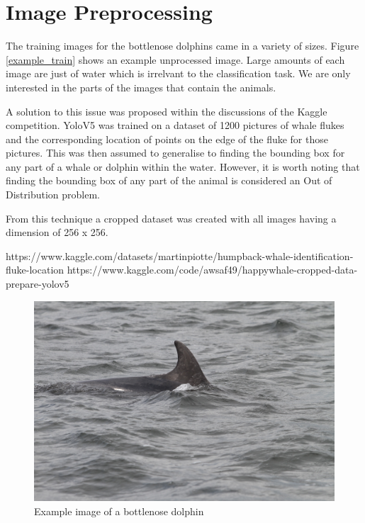 \documentclass{article}
\begin{document}
\section{Image Preprocessing}

The training images for the bottlenose dolphins came in a variety of sizes. Figure \ref{example_train} shows an example unprocessed image. Large amounts of each image are just of water which is irrelvant to the classification task. We are only interested in the parts of the 
images that contain the animals.

A solution to this issue was proposed within the discussions of the Kaggle competition. YoloV5 was trained on a dataset of 1200 pictures of whale flukes and the corresponding location of points on the edge of the fluke for those pictures. 
This was then assumed to generalise to finding the bounding box for any part of a whale or dolphin within the water. However, it is worth noting that finding the bounding box of any part of the animal is considered an Out of Distribution problem. 

From this technique a cropped dataset was created with all images having a dimension of 256 x 256. 


https://www.kaggle.com/datasets/martinpiotte/humpback-whale-identification-fluke-location
https://www.kaggle.com/code/awsaf49/happywhale-cropped-data-prepare-yolov5





\begin{figure}
    \includegraphics[width=\linewidth]{example_train.jpg}
    \caption{Example image of a bottlenose dolphin}
    \label{fig:example_train}
\end{figure}
\end{document}
